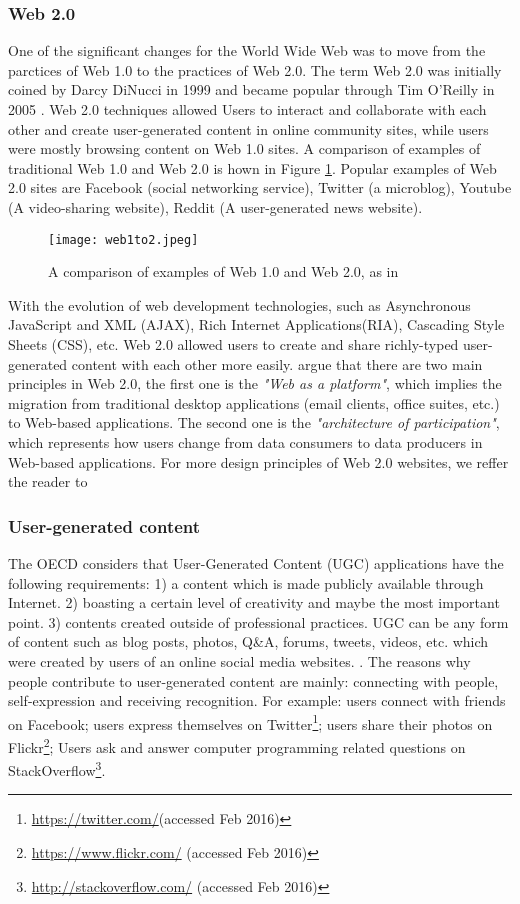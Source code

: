 \subsubsection{Web 2.0}
One of the significant changes for the World Wide Web was to move from the parctices of Web 1.0 to the practices of Web 2.0. The term Web 2.0 was initially coined by Darcy DiNucci in 1999 \cite{dinucci2012fragmented} and became popular through Tim O'Reilly in 2005 \cite{o2009design}. Web 2.0 techniques allowed Users to interact and collaborate with each other and create user-generated content in online community sites, while users were mostly browsing content on Web 1.0 sites. A comparison of examples of traditional Web 1.0 and Web 2.0 is hown in Figure \ref{fig:web1to2}. Popular examples of Web 2.0 sites are Facebook (social networking service), Twitter (a microblog), Youtube (A video-sharing website), Reddit (A user-generated news website).

\begin{figure}%
\centering
\texttt{[image: web1to2.jpeg]}  
\caption{A comparison of examples of Web 1.0 and Web 2.0, as in \cite{o2009design}}
\label{fig:web1to2} 
\end{figure}
With the evolution of web development technologies, such as Asynchronous JavaScript and XML (AJAX), Rich Internet Applications(RIA), Cascading Style Sheets (CSS), etc. Web 2.0 allowed users to create and share richly-typed user-generated content with each other more easily. \cite{passant2009technologies} argue that there are two main principles in Web 2.0, the first one is the \textit{"Web as a platform"}, which implies the migration from traditional desktop applications (email clients, office suites, etc.) to Web-based applications. The second one is the \textit{"architecture of participation"}, which represents how users change from data consumers to data producers in Web-based applications. For more design principles of Web 2.0 websites, we reffer the reader to \cite{o2009design} 


\subsubsection{User-generated content}
The OECD\cite{web2007web} considers that User-Generated Content (UGC) applications have the following requirements: 1) a content which is made publicly available through Internet. 2) boasting a certain level of creativity and maybe the most important point. 3) contents created outside of professional practices. UGC can be any form of content such as blog posts, photos, Q\&A, forums, tweets, videos, etc. which were created by users of an online social media websites. \cite{moens2014mining}. The reasons why people contribute to user-generated content are mainly: connecting with people, self-expression and receiving recognition. For example: users connect with friends on Facebook; users express themselves on Twitter\footnote{\url{https://twitter.com/}(accessed Feb 2016)}; users share their photos on Flickr\footnote{\url{https://www.flickr.com/} (accessed Feb 2016)}; Users ask and answer computer programming related questions on StackOverflow\footnote{\url{http://stackoverflow.com/} (accessed Feb 2016)}. 

